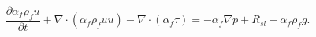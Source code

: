 \begin{equation}
\frac{\partial \alpha_f \rho_f u}{\partial t}   +
\nabla \cdot (\alpha_f \rho_f u u) - \nabla \cdot (\alpha_f \tau)  = 
 - \alpha_f \nabla p + R_{sl} + \alpha_f \rho_f g .
 \label{eq:nsmomentumequation3}
\end{equation}
